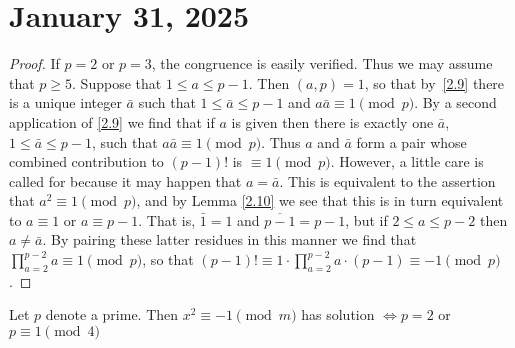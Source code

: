 \documentclass[11pt]{article}
\begin{document}
\section{January 31, 2025}
\begin{proof}
    If \(p = 2\) or \(p = 3\), the congruence is easily verified. Thus we may assume that \(p \geq 5\). Suppose that \(1 \leq a \leq p - 1\). Then \((a, p) = 1\), so that by~\ref{2.9} there is a unique integer \(\bar{a}\) such that \(1 \leq \bar{a} \leq p - 1\) and \(a\bar{a} \equiv 1 \pmod{p}\). By a second application of \ref{2.9} we find that if \(a\) is given then there is exactly one \(\bar{a}\), \(1 \leq \bar{a} \leq p - 1\), such that \(a\bar{a} \equiv 1 \pmod{p}\). Thus \(a\) and \(\bar{a}\) form a pair whose combined contribution to \((p - 1)!\) is \(\equiv 1 \pmod{p}\). However, a little care is called for because it may happen that \(a = \bar{a}\). This is equivalent to the assertion that \(a^2 \equiv 1 \pmod{p}\), and by Lemma \ref{2.10} we see that this is in turn equivalent to \(a \equiv 1\) or \(a \equiv p - 1\). That is, \(\bar{1} = 1\) and \(\overline{p - 1} = p - 1\), but if \(2 \leq a \leq p - 2\) then \(a \neq \bar{a}\). By pairing these latter residues in this manner we find that \(\prod_{a=2}^{p-2} a \equiv 1 \pmod{p}\), so that \((p - 1)! \equiv 1 \cdot \prod_{a=2}^{p-2} a \cdot (p - 1) \equiv -1 \pmod{p}\).
\end{proof}
\begin{theorem}\label{2.12}
    Let \(p\) denote a prime. Then \(x^2 \equiv -1 \pmod {m}\) has solution \(\Longleftrightarrow p = 2\) or \(p \equiv 1 \pmod{4}\)
\end{theorem}
\end{document}
